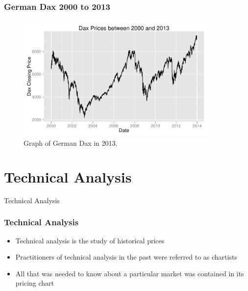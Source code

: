 \documentclass{beamer}
\begin{document}
\begin{frame}
\frametitle{German Dax 2000 to 2013}
\begin{figure}
\centering
\includegraphics[width=10cm]{../Figures/chp3_dax_2000_2013}
\caption{Graph of German Dax in 2013.}
\label{fig:chp3_dax_2000_2013}
\end{figure}

\end{frame}

\section{Technical Analysis} %

\begin{frame}
\Huge{\centerline{Technical Analysis}}
\end{frame}

\begin{frame}
\frametitle{Technical Analysis}
\begin{itemize}
\item Technical analysis is the study of historical prices \pause
\item Practitioners of technical analysis in the past were referred to as chartists \pause
\item All that was needed to know about a particular market was contained in its pricing chart
\end{itemize}

\end{frame}
\end{document}
